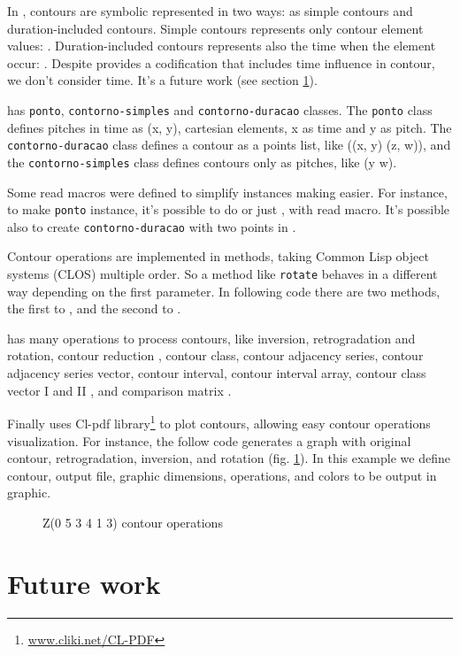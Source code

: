 In \goiaba{}, contours are symbolic represented in two ways: as simple
contours and duration-included contours. Simple contours represents
only contour element values: . Duration-included
contours represents also the time when the element occur: . Despite \goiaba{} provides a codification that
includes time influence in contour, we don't consider time. It's a
future work (see section \ref{sec:future-work}).

\goiaba{} has \texttt{ponto}, \texttt{contorno-simples} and
\texttt{contorno-duracao} classes. The \texttt{ponto} class defines
pitches in time as (x, y), cartesian elements, x as time and y as
pitch. The \texttt{contorno-duracao} class defines a contour as a
points list, like ((x, y) (z, w)), and the \texttt{contorno-simples}
class defines contours only as pitches, like (y w).

Some read macros were defined to simplify instances making easier. For
instance, to make \texttt{ponto} instance, it's possible to do
 or just , with
read macro. It's possible also to create \texttt{contorno-duracao}
with two points in .

Contour operations are implemented in methods, taking Common Lisp
object systems (CLOS) multiple order. So a method like \texttt{rotate}
behaves in a different way depending on the first parameter. In
following code there are two methods, the first to
, and the second to .



\goiaba{} has many operations to process contours, like inversion,
retrogradation and rotation, contour reduction \cite{adams76:melodic},
contour class, contour adjacency series, contour adjacency series
vector, contour interval, contour interval array, contour class vector
I and II \cite{friedmann85:methodology}, and comparison matrix
\cite{morris93:directions}.

Finally \goiaba{} uses Cl-pdf
library\footnote{\url{www.cliki.net/CL-PDF}} to plot contours,
allowing easy contour operations visualization. For instance, the
follow code generates a graph with original contour, retrogradation,
inversion, and rotation (fig. \ref{fig:operacoes}). In this example we
define  contour, output file, graphic dimensions, operations,
and colors to be output in graphic.


\begin{figure}
  \centering
  \caption{Z(0 5 3 4 1 3) contour operations}
  \label{fig:operacoes}
\end{figure}

\section{Future work}
\label{sec:future-work}


